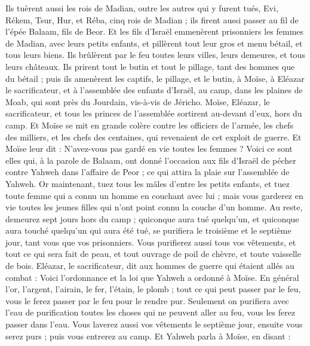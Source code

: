 \begin{multicols}{2}
Ils tuèrent aussi les rois de Madian, outre les autres qui y furent tués, Evi, Rékem, Tsur, Hur, et Réba, cinq rois de Madian ; ils firent aussi passer au fil de l'épée Balaam, fils de Beor.
Et les fils d'Israël emmenèrent prisonniers les femmes de Madian, avec leurs petits enfants, et pillèrent tout leur gros et menu bétail, et tous leurs biens.
Ils brûlèrent par le feu toutes leurs villes, leurs demeures, et tous leurs châteaux.
Ils prirent tout le butin et tout le pillage, tant des hommes que du bétail ;
puis ils amenèrent les captifs, le pillage, et le butin, à Moïse, à Eléazar le sacrificateur, et à l'assemblée des enfants d'Israël, au camp, dans les plaines de Moab, qui sont près du Jourdain, vis-à-vis de Jéricho.
Moïse, Eléazar, le sacrificateur, et tous les princes de l'assemblée sortirent au-devant d'eux, hors du camp.
Et Moïse se mit en grande colère contre les officiers de l'armée, les chefs des milliers, et les chefs des centaines, qui revenaient de cet exploit de guerre.
Et Moïse leur dit : N'avez-vous pas gardé en vie toutes les femmes ?
Voici ce sont elles qui, à la parole de Balaam, ont donné l'occasion aux fils d’Israël de pécher contre Yahweh dans l'affaire de Peor ; ce qui attira la plaie sur l'assemblée de Yahweh.
Or maintenant, tuez tous les mâles d'entre les petits enfants, et tuez toute femme qui a connu un homme en couchant avec lui ;
mais vous garderez en vie toutes les jeunes filles qui n'ont point connu la couche d'un homme.
Au reste, demeurez sept jours hors du camp ; quiconque aura tué quelqu'un, et quiconque aura touché quelqu'un qui aura été tué, se purifiera le troisième et le septième jour, tant vous que vos prisonniers.
Vous purifierez aussi tous vos vêtements, et tout ce qui sera fait de peau, et tout ouvrage de poil de chèvre, et toute vaisselle de bois.
Eléazar, le sacrificateur, dit aux hommes de guerre qui étaient allés au combat : Voici l'ordonnance et la loi que Yahweh a ordonné à Moïse.
En général l'or, l'argent, l'airain, le fer, l'étain, le plomb ;
tout ce qui peut passer par le feu, vous le ferez passer par le feu pour le rendre pur. Seulement on purifiera avec l'eau de purification toutes les choses qui ne peuvent aller au feu, vous les ferez passer dans l'eau.
Vous laverez aussi vos vêtements le septième jour, ensuite vous serez purs ; puis vous entrerez au camp.
Et Yahweh parla à Moïse, en disant :

\end{multicols}
